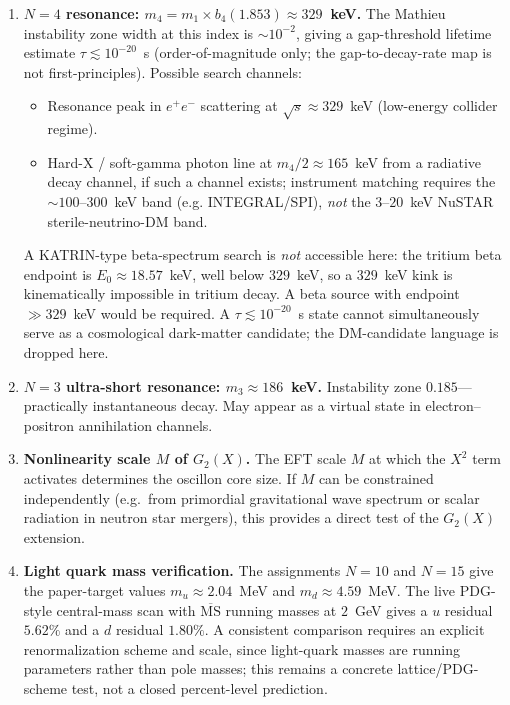 \documentclass[11pt]{article}
\begin{document}
\begin{enumerate}
  \item \textbf{$N = 4$ resonance:
    $m_4 = m_1 \times b_4(1.853) \approx 329$~keV.}
    The Mathieu instability zone width at this index is
    $\sim 10^{-2}$, giving a gap-threshold lifetime estimate
    $\tau \lesssim 10^{-20}$~s (order-of-magnitude only;
    the gap-to-decay-rate map is not first-principles).
    Possible search channels:
    \begin{itemize}
      \item Resonance peak in $e^+e^-$ scattering at
        $\sqrt{s}\approx 329$~keV (low-energy collider
        regime).
      \item Hard-X / soft-gamma photon line at
        $m_4/2\approx 165$~keV from a radiative decay
        channel, if such a channel exists; instrument
        matching requires the $\sim 100$--$300$~keV band
        (e.g. INTEGRAL/SPI), \emph{not} the $3$--$20$~keV
        NuSTAR sterile-neutrino-DM band.
    \end{itemize}
    A KATRIN-type beta-spectrum search is \emph{not} accessible
    here: the tritium beta endpoint is $E_0\approx18.57$~keV,
    well below $329$~keV, so a $329$~keV kink is kinematically
    impossible in tritium decay. A beta source with endpoint
    $\gg329$~keV would be required.
    A $\tau \lesssim 10^{-20}$~s state cannot simultaneously
    serve as a cosmological dark-matter candidate; the
    DM-candidate language is dropped here.

  \item \textbf{$N = 3$ ultra-short resonance:
    $m_3 \approx 186$~keV.}
    Instability zone $0.185$---practically
    instantaneous decay. May appear as a virtual state
    in electron--positron annihilation channels.

  \item \textbf{Nonlinearity scale $M$ of $G_2(X)$.}
    The EFT scale $M$ at which the $X^2$ term
    activates determines the oscillon core size.
    If $M$ can be constrained independently
    (e.g.\ from primordial gravitational wave
    spectrum or scalar radiation in neutron star
    mergers), this provides a direct test of the
    $G_2(X)$ extension.

  \item \textbf{Light quark mass verification.}
    The assignments $N=10$ and $N=15$ give the paper-target
    values $m_u\approx 2.04$~MeV and
    $m_d\approx 4.59$~MeV. The live PDG-style central-mass
    scan with $\overline{\mathrm{MS}}$ running masses at
    $2$~GeV gives a $u$ residual $5.62\%$ and a $d$
    residual $1.80\%$. A consistent comparison requires an
    explicit renormalization scheme and scale, since
    light-quark masses are running parameters rather than
    pole masses; this remains a concrete lattice/PDG-scheme
    test, not a closed percent-level prediction.


\end{enumerate}
\end{document}

